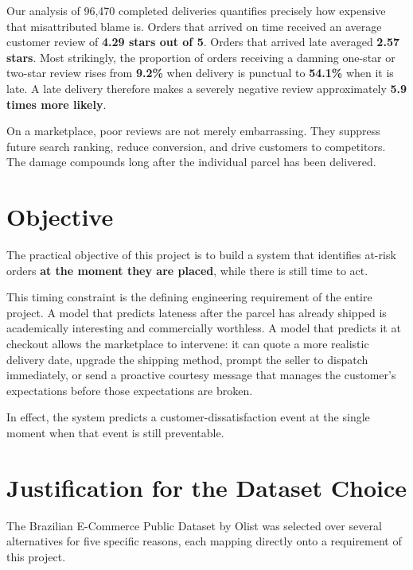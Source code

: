 \documentclass[11pt,a4paper]{report}
\begin{document}
Our analysis of 96{,}470 completed deliveries quantifies precisely how expensive
that misattributed blame is. Orders that arrived on time received an average
customer review of \textbf{4.29 stars out of 5}. Orders that arrived late
averaged \textbf{2.57 stars}. Most strikingly, the proportion of orders receiving
a damning one-star or two-star review rises from \textbf{9.2\%} when delivery is
punctual to \textbf{54.1\%} when it is late. A late delivery therefore makes a
severely negative review approximately \textbf{5.9 times more likely}.

On a marketplace, poor reviews are not merely embarrassing. They suppress future
search ranking, reduce conversion, and drive customers to competitors. The
damage compounds long after the individual parcel has been delivered.

\section{Objective}

The practical objective of this project is to build a system that identifies
at-risk orders \textbf{at the moment they are placed}, while there is still time
to act.

This timing constraint is the defining engineering requirement of the entire
project. A model that predicts lateness after the parcel has already shipped is
academically interesting and commercially worthless. A model that predicts it at
checkout allows the marketplace to intervene: it can quote a more realistic
delivery date, upgrade the shipping method, prompt the seller to dispatch
immediately, or send a proactive courtesy message that manages the customer's
expectations before those expectations are broken.

In effect, the system predicts a customer-dissatisfaction event at the single
moment when that event is still preventable.

\section{Justification for the Dataset Choice}

The Brazilian E-Commerce Public Dataset by Olist was selected over several
alternatives for five specific reasons, each mapping directly onto a requirement
of this project.
\end{document}
